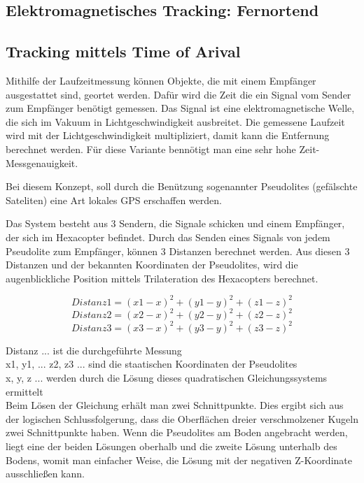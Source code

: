     \subsection{Elektromagnetisches Tracking: Fernortend}

      \subsection*{Tracking mittels Time of Arival}
      Mithilfe der Laufzeitmessung können Objekte, die mit einem Empfänger ausgestattet sind, geortet werden. Dafür wird die Zeit die ein Signal vom Sender zum Empfänger benötigt gemessen. Das Signal ist eine elektromagnetische Welle, die sich im Vakuum in Lichtgeschwindigkeit ausbreitet. Die gemessene Laufzeit wird mit der Lichtgeschwindigkeit multipliziert, damit kann die Entfernung berechnet werden. Für diese Variante bennötigt man eine sehr hohe Zeit-Messgenauigkeit.

      Bei diesem Konzept, soll durch die Benützung sogenannter Pseudolites (gefälschte Sateliten) eine Art lokales GPS erschaffen werden.

      Das System besteht aus 3 Sendern, die Signale schicken und einem Empfänger, der sich im Hexacopter befindet.
      Durch das Senden eines Signals von jedem Pseudolite zum Empfänger, können 3 Distanzen berechnet werden.
      Aus diesen 3 Distanzen und der bekannten Koordinaten der Pseudolites, wird die augenblickliche Position mittels Trilateration\cite{pos_signal_2} des Hexacopters berechnet.

\[
      Distanz 1 = (x1 - x)^{2} + (y1 - y)^{2} + (z1 - z)^{2}
\]
\[
      Distanz 2 = (x2 - x)^{2} + (y2 - y)^{2} + (z2 - z)^{2}
\]
\[
      Distanz 3 = (x3 - x)^{2} + (y3 - y)^{2} + (z3 - z)^{2}
\]

      Distanz ... ist die durchgeführte Messung\\
      x1, y1, ... z2, z3 ... sind die staatischen Koordinaten der Pseudolites \\
      x, y, z ... werden durch die Lösung dieses quadratischen Gleichungssystems ermittelt \\

      Beim Lösen der Gleichung erhält man zwei Schnittpunkte. Dies ergibt sich aus der logischen Schlussfolgerung, dass die Oberflächen dreier verschmolzener Kugeln zwei Schnittpunkte haben.
      Wenn die Pseudolites am Boden angebracht werden, liegt eine der beiden Lösungen oberhalb und die zweite Lösung unterhalb des Bodens, womit man einfacher Weise, die Lösung mit der negativen Z-Koordinate ausschließen kann.

